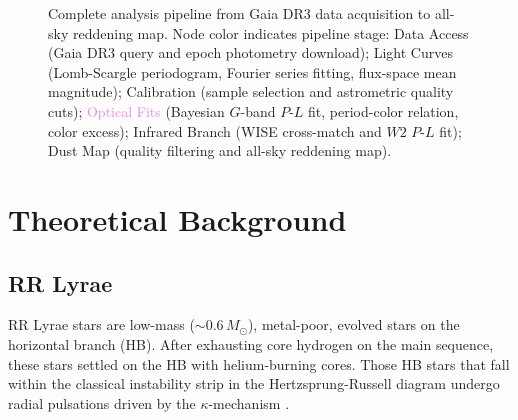 \documentclass[10pt,preprint2]{aastex}
\begin{document}
\begin{figure}[t]
{%
  }
  \caption{Complete analysis pipeline from Gaia DR3 data acquisition to all-sky reddening map. Node color indicates pipeline stage: \textcolor{blue!70!black}{Data Access} (Gaia DR3 query and epoch photometry download); \textcolor{cyan!60!black}{Light Curves} (Lomb-Scargle periodogram, Fourier series fitting, flux-space mean magnitude); \textcolor{orange!70!black}{Calibration} (sample selection and astrometric quality cuts); \textcolor{violet}{Optical Fits} (Bayesian $G$-band $P$-$L$ fit, period-color relation, color excess); \textcolor{green!60!black}{Infrared Branch} (WISE cross-match and $W2$ $P$-$L$ fit); \textcolor{red!60!black}{Dust Map} (quality filtering and all-sky reddening map).}
  \label{fig:pipeline}
\end{figure}

\section{Theoretical Background}
\label{sec:theory}

\subsection{RR Lyrae}

RR Lyrae stars are low-mass ($\sim 0.6\,M_\odot$), metal-poor, evolved stars on the horizontal branch (HB). After exhausting core hydrogen on the main sequence, these stars settled on the HB with helium-burning cores. Those HB stars that fall within the classical instability strip in the Hertzsprung-Russell diagram undergo radial pulsations driven by the $\kappa$-mechanism \citep{CatelanSmith2015}.
\end{document}
